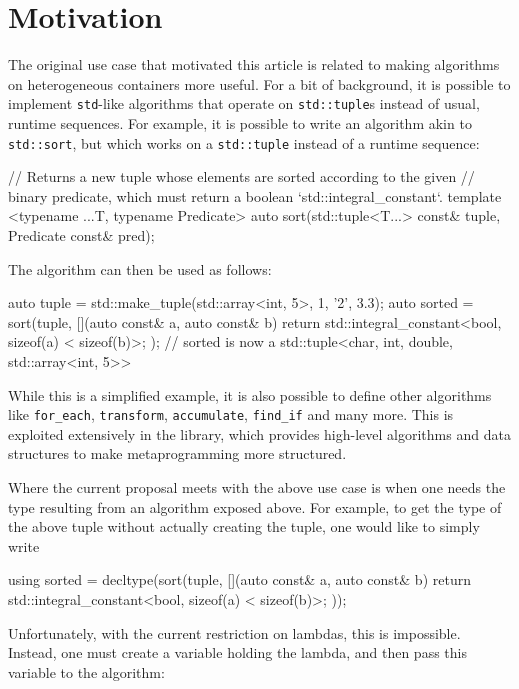 \documentclass[11pt]{article}
\newcommand{\cc}[1]{\texttt{#1}}
\begin{document}
\section{Motivation}
The original use case that motivated this article is related to making algorithms
on heterogeneous containers more useful. For a bit of background, it is possible
to implement \cc{std}-like algorithms that operate on \cc{std::tuple}s instead of
usual, runtime sequences. For example, it is possible to write an algorithm akin
to \cc{std::sort}, but which works on a \cc{std::tuple} instead of a runtime
sequence:

\begin{cpp}
// Returns a new tuple whose elements are sorted according to the given
// binary predicate, which must return a boolean `std::integral_constant`.
template <typename ...T, typename Predicate>
auto sort(std::tuple<T...> const& tuple, Predicate const& pred);
\end{cpp}

The algorithm can then be used as follows:

\begin{cpp}
auto tuple = std::make_tuple(std::array<int, 5>{}, 1, '2', 3.3);
auto sorted = sort(tuple, [](auto const& a, auto const& b) {
  return std::integral_constant<bool, sizeof(a) < sizeof(b)>{};
});
// sorted is now a std::tuple<char, int, double, std::array<int, 5>>
\end{cpp}

While this is a simplified example, it is also possible to define other algorithms
like \cc{for_each}, \cc{transform}, \cc{accumulate}, \cc{find_if} and many more. This
is exploited extensively in the \cite{Boost.Hana} library, which provides high-level
algorithms and data structures to make metaprogramming more structured.

Where the current proposal meets with the above use case is when one needs the type
resulting from an algorithm exposed above. For example, to get the type of the above
tuple without actually creating the tuple, one would like to simply write

\begin{cpp}
using sorted = decltype(sort(tuple, [](auto const& a, auto const& b) {
  return std::integral_constant<bool, sizeof(a) < sizeof(b)>{};
}));
\end{cpp}

Unfortunately, with the current restriction on lambdas, this is impossible.
Instead, one must create a variable holding the lambda, and then pass this
variable to the algorithm:
\end{document}
